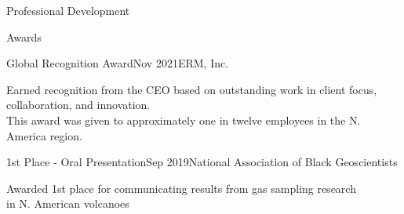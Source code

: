 \documentclass{resume} %
\begin{document}
\begin{rSection}{Professional Development}



\end{rSection} 

\begin{rSection}{Awards}

\begin{rSubsection}{Global Recognition Award}{Nov 2021}{ERM, Inc.}{}
\item {Earned recognition from the CEO based on outstanding work in client focus, collaboration, and innovation. \\ This award was given to approximately one in twelve employees in the N. America region.}
\end{rSubsection}


\begin{rSubsection}{1st Place - Oral Presentation}{Sep 2019}{National Association of Black Geoscientists}{}
\item {Awarded 1st place for communicating results from gas sampling research \\ in N. American volcanoes}
\end{rSubsection}

\end{rSection}

\end{document}
